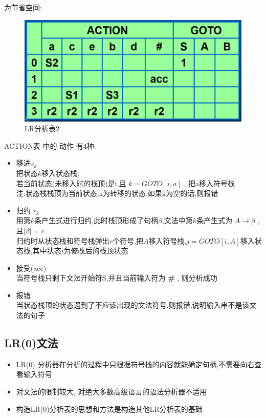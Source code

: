 \documentclass[UTF8,a4paper]{ctexart}
\begin{document}
 为节省空间:
 \begin{figure}[H]
  \centering
  \includegraphics[scale = 0.3]{assets/CompilerConstructionPrinciples_a9086.png}
  \caption{LR分析表2}
 \end{figure}

 ACTION表 中的 动作 有4种:
 \begin{itemize}
  \item 移进$s_k$\\
        把状态$k$移入状态栈;\\
        若当前状态(未移入时的栈顶)是i,且 $k = GOTO[i,a]$ , 把a移入符号栈\\
        注:状态栈栈顶为当前状态;k为转移的状态,如果k为空的话,则报错
  \item 归约 $r_k$\\
        用第$k$条产生式进行归约,此时栈顶形成了句柄$\beta$,文法中第$k$条产生式为
        $A \to \beta$ , 且$|\beta| = r$\\
        归约时从状态栈和符号栈弹出$r$个符号,把$A$移入符号栈,$j = GOTO[i,A]$移入状态栈,其中状态$i$为修改后的栈顶状态
  \item 接受(acc)\\
        当符号栈只剩下文法开始符S,并且当前输入符为 \textbf{\#} , 则分析成功
  \item 报错\\
        当状态栈顶的状态遇到了不应该出现的文法符号,则报错,说明输入串不是该文法的句子
 \end{itemize}

 \subsection{LR(0)文法}
 \begin{itemize}
  \item LR(0) 分析器在分析的过程中只根据符号栈的内容就能确定句柄,不需要向右查看输入符号
  \item 对文法的限制较大, 对绝大多数高级语言的语法分析器不适用
  \item 构造LR(0)分析表的思想和方法是构造其他LR分析表的基础
 \end{itemize}
\end{document}
